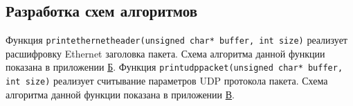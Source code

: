 \subsection{Разработка схем алгоритмов}

Функция \texttt{print{\textunderscore}ethernet{\textunderscore}header(unsigned char* buffer, int size)}
реализует расшифровку Ethernet заголовка пакета. Схема алгоритма данной
функции показана в приложении \hyperref[sec:appendix:scheme_method1]{Б}.
Функция \texttt{print{\textunderscore}udp{\textunderscore}packet(unsigned char* buffer, int size)}
реализует считывание параметров UDP протокола пакета. Схема алгоритма
данной функции показана в приложении \hyperref[sec:appendix:scheme_method2]{В}.